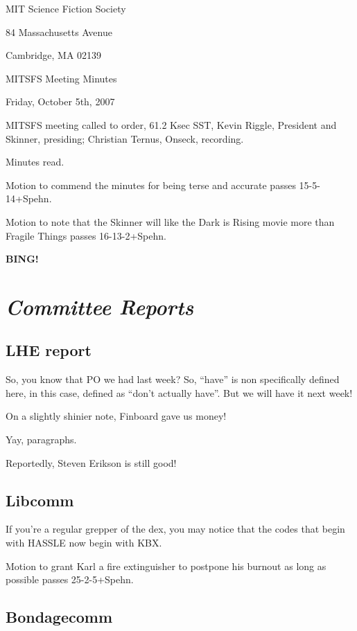 \documentclass[10pt]{article}
\newcommand{\bing}{{\bf BING!} }
\newcommand{\goto}[1]{\bing \vskip 12pt \section*{{\em{#1}}}}
\begin{document}
\begin{center}

MIT Science Fiction Society

84 Massachusetts Avenue

Cambridge, MA 02139

\vspace{12pt}

MITSFS Meeting Minutes

Friday, October 5th, 2007

\end{center}

\vspace{18pt}

\setlength{\parskip}{6pt}

\noindent
MITSFS meeting called to order, 61.2 Ksec SST,
Kevin Riggle, President and Skinner, presiding; Christian Ternus, Onseck, recording.

Minutes read.

Motion to commend the minutes for being terse and accurate passes 15-5-14+Spehn.

Motion to note that the Skinner will like the Dark is Rising movie more than Fragile Things passes 16-13-2+Spehn.

\BING

\goto{Committee Reports}

\subsection*{LHE report}

So, you know that PO we had last week?  So, ``have'' is non specifically defined here, in this case, defined as ``don't actually have''.  But we will have it next week!

On a slightly shinier note, Finboard gave us money!  

Yay, paragraphs. 

Reportedly, Steven Erikson is still good!

\subsection*{Libcomm}

If you're a regular grepper of the dex, you may notice that the codes that begin with HASSLE now begin with KBX.

Motion to grant Karl a fire extinguisher to postpone his burnout as long as possible passes 25-2-5+Spehn.

\subsection*{Bondagecomm}
\end{document}
